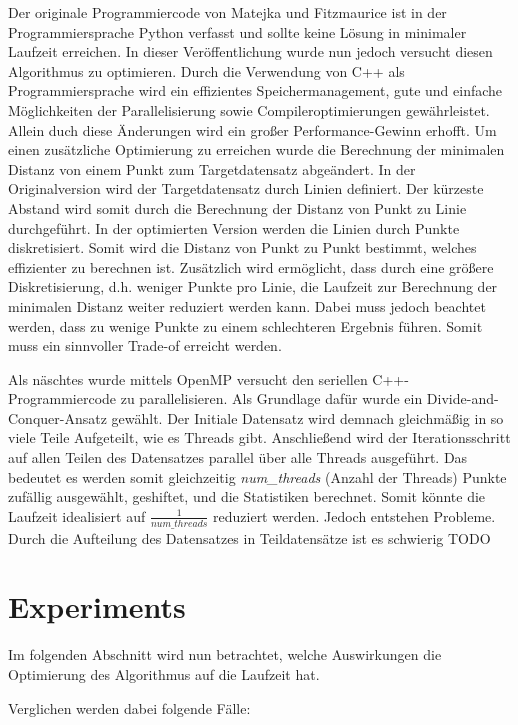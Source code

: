 \documentclass[sigconf]{acmart}
\begin{document}
Der originale Programmiercode von Matejka und Fitzmaurice ist in der Programmiersprache Python verfasst und sollte keine Lösung in minimaler Laufzeit erreichen. In dieser Veröffentlichung wurde nun jedoch versucht diesen Algorithmus zu optimieren. Durch die Verwendung von C++ als Programmiersprache wird ein effizientes Speichermanagement, gute und einfache Möglichkeiten der Parallelisierung sowie Compileroptimierungen gewährleistet. Allein duch diese Änderungen wird ein großer Performance-Gewinn erhofft. 
Um einen zusätzliche Optimierung zu erreichen wurde die Berechnung der minimalen Distanz von einem Punkt zum Targetdatensatz abgeändert. In der Originalversion wird der Targetdatensatz durch Linien definiert. Der kürzeste Abstand wird somit durch die Berechnung der Distanz von Punkt zu Linie durchgeführt. In der optimierten Version werden die Linien durch Punkte diskretisiert. Somit wird die Distanz von Punkt zu Punkt bestimmt, welches effizienter zu berechnen ist. Zusätzlich wird ermöglicht, dass durch eine größere Diskretisierung, d.h. weniger Punkte pro Linie, die Laufzeit zur Berechnung der minimalen Distanz weiter reduziert werden kann. Dabei muss jedoch beachtet werden, dass zu wenige Punkte zu einem schlechteren Ergebnis führen. Somit muss ein sinnvoller Trade-of erreicht werden.

Als näschtes wurde mittels OpenMP versucht den seriellen C++-Programmiercode zu parallelisieren. Als Grundlage dafür wurde ein Divide-and-Conquer-Ansatz gewählt. Der Initiale Datensatz wird demnach gleichmäßig in so viele Teile Aufgeteilt, wie es Threads gibt. Anschließend wird der Iterationsschritt auf allen Teilen des Datensatzes parallel über alle Threads ausgeführt. Das bedeutet es werden somit gleichzeitig \textit{num\_threads} (Anzahl der Threads) Punkte zufällig ausgewählt, geshiftet, und die Statistiken berechnet. Somit könnte die Laufzeit idealisiert auf $\frac{1}{num\_threads}$ reduziert werden.
Jedoch entstehen Probleme. Durch die Aufteilung des Datensatzes in Teildatensätze ist es schwierig TODO



\section{Experiments}\label{sec:exp}

Im folgenden Abschnitt wird nun betrachtet, welche Auswirkungen die Optimierung des Algorithmus auf die Laufzeit hat. 

Verglichen werden dabei folgende Fälle:
\end{document}
